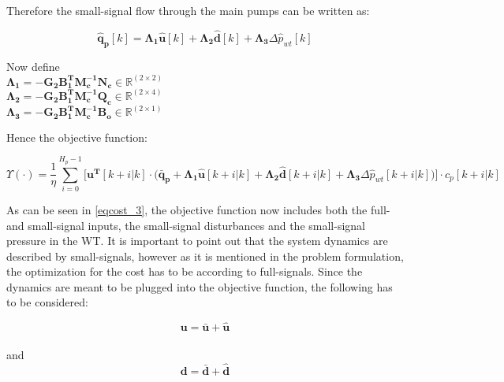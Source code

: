 Therefore the small-signal flow through the main pumps can be written as: 

 \begin{equation}
 \bm{\hat{q}_{p}}[k] =   \bm{\Lambda_1} \bm{\hat{u}}[k] + \bm{\Lambda_2} \bm{\hat{d}}[k] + \bm{\Lambda_3} \Delta \hat{p}_{wt}[k]
 \label{pumpflows_simplified}
\end{equation}

\begin{minipage}[t]{0.80\textwidth}
Now define\\
\hspace*{8mm} $\bm{\Lambda_1} = -\bm{G_{2}} \bm{B_{1}^T}\bm{M_c^{-1}}\bm{N_c} \in \pmb{\mathbb{R}}^{(2 \times 2)}$ \\
\hspace*{8mm} $\bm{\Lambda_2} = -\bm{G_{2}} \bm{B_{1}^T}\bm{M_c^{-1}}\bm{Q_c} \in \pmb{\mathbb{R}}^{(2 \times 4)}$ \\
\hspace*{8mm} $\bm{\Lambda_3} = -\bm{G_{2}} \bm{B_{1}^T}\bm{M_c^{-1}}\bm{B_{o}} \in \pmb{\mathbb{R}}^{(2 \times 1)}$ 
\end{minipage}

Hence the objective function:

\begin{equation}
\! \Upsilon(\cdot) \!=\! \frac{1}{\eta}\! \sum_{i=0}^{H_p-1}\! \Big[ \bm{u^T}[k+i|k] \cdot \Big(\bm{\bar{q}_p} +  \bm{\Lambda_1} \bm{\hat{u}}[k+i|k] + \bm{\Lambda_2} \bm{\hat{d}}[k+i|k] + \bm{\Lambda_3} \Delta \hat{p}_{wt}[k+i|k]\!\Big)\!\Big] \! \cdot c_p[k+i|k]
\label{eqcost_3} 
\end{equation}

As can be seen in \eqref{eqcost_3}, the objective function now includes both the full- and small-signal inputs, the small-signal disturbances and the small-signal pressure in the WT. It is important to point out that the system dynamics are described by small-signals, however as it is mentioned in the problem formulation, the optimization for the cost has to be according to full-signals. Since the dynamics are meant to be plugged into the objective function, the following has to be considered: 

\begin{equation}
\bm{u} = \bm{\bar{u}} + \bm{\hat{u}}
\label{u_pred}
\end{equation}\\
and\\
\begin{equation}
\bm{d} = \bm{\bar{d}} + \bm{\hat{d}}
\end{equation}

